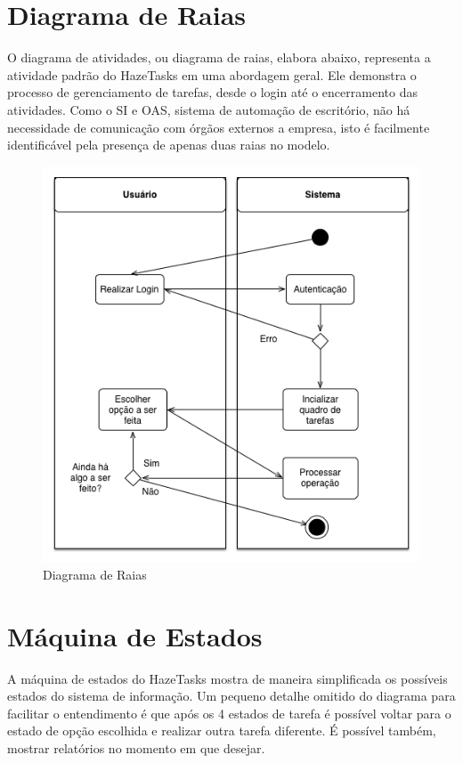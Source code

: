 \documentclass[a4paper, 12pt]{article}
\begin{document}
	\section{Diagrama de Raias}
	
	O diagrama de atividades, ou diagrama de raias, elabora abaixo, representa a atividade padrão do HazeTasks em uma abordagem geral. Ele demonstra o processo de gerenciamento de tarefas, desde o login até o encerramento das atividades. Como o SI e OAS, sistema de automação de escritório, não há necessidade de comunicação com órgãos externos a empresa, isto é facilmente identificável pela presença de apenas duas raias no modelo.
	
	\begin{figure}[H]
		\centering
		\includegraphics[scale=0.6]{actvdiagram.png}
		\caption{Diagrama de Raias}
	\end{figure}
	
	\newpage
	
	\section{Máquina de Estados}
	
	A máquina de estados do HazeTasks mostra de maneira simplificada os possíveis estados do sistema de informação. Um pequeno detalhe omitido do diagrama para facilitar o entendimento é que após os 4 estados de tarefa é possível voltar para o estado de opção escolhida e realizar outra tarefa diferente. É possível também, mostrar relatórios no momento em que desejar.\\\\
	
\end{document}
